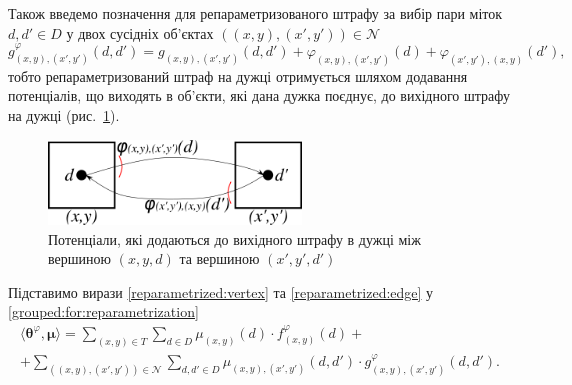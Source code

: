 Також введемо позначення для репараметризованого штрафу за вибір пари міток
$d, d' \in D$ у двох сусідніх об'єктах
$\left( \left(x, y \right), \left(x', y'\right) \right) \in \mathcal{N}$
\begin{equation} \label{reparametrized:edge}
    g_{\left(x, y \right), \left(x', y'\right)}^{\varphi} \left(d, d' \right) =
    g_{\left(x, y \right), \left(x', y' \right)} \left(d, d' \right) +
    \varphi_{\left(x, y \right), \left(x', y' \right)} \left( d \right) +
    \varphi_{\left(x', y' \right), \left(x, y \right)} \left( d' \right),
\end{equation}
тобто репараметризований
штраф на дужці отримується шляхом додавання потенціалів,
що виходять в об'єкти, які дана дужка поєднує, до вихідного штрафу на дужці
(рис.~\ref{fig:reparametrized:edge:weight}).

\begin{figure}[h]
  \centering
  \includegraphics[width=0.6\textwidth]{images/reparametrized_edge_weight}
  \caption{Потенціали, які додаються до вихідного штрафу в дужці між вершиною
           $\left(x, y, d \right)$ та вершиною $\left(x', y', d' \right)$}
  \label{fig:reparametrized:edge:weight}
\end{figure}

Підставимо вирази \eqref{reparametrized:vertex} та \eqref{reparametrized:edge}
у \eqref{grouped:for:reparametrization}
\begin{equation*}
\begin{gathered}
    \langle \pmb{\theta}^{\varphi}, \pmb{\mu} \rangle =
    \sum \limits_{\left(x, y \right) \in T}
        \sum \limits_{d \in D}
            \mu_{\left(x, y \right)} \left(d \right) \cdot
            f_{\left(x, y \right)}^{\varphi} \left(d \right) + \\
    + \sum \limits_{\left(\left(x, y \right), \left(x', y' \right)\right)\in \mathcal{N}}
        \sum \limits_{d, d' \in D}
            \mu_{\left(x, y \right), \left(x', y' \right)} \left(d, d' \right)
            \cdot g_{\left(x, y \right), \left(x', y'\right)}^{\varphi} \left(
                d, d'
            \right).
\end{gathered}
\end{equation*}

